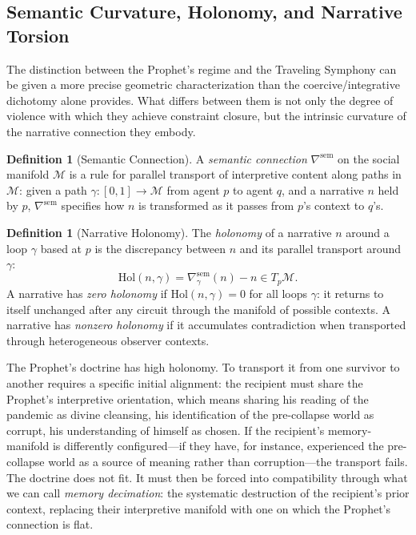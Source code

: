 \documentclass[12pt, oneside]{article}
\theoremstyle{plain}
\theoremstyle{definition}
\newtheorem{definition}[theorem]{Definition}
\theoremstyle{remark}
\begin{document}
\subsection{Semantic Curvature, Holonomy, and Narrative Torsion}

The distinction between the Prophet's regime and the Traveling
Symphony can be given a more precise geometric characterization than
the coercive/integrative dichotomy alone provides. What differs
between them is not only the degree of violence with which they
achieve constraint closure, but the intrinsic curvature of the
narrative connection they embody.

\begin{definition}[Semantic Connection]
A \emph{semantic connection} $\nabla^{\mathrm{sem}}$ on the social
manifold $\mathcal{M}$ is a rule for parallel transport of
interpretive content along paths in $\mathcal{M}$: given a path
$\gamma : [0,1] \to \mathcal{M}$ from agent $p$ to agent $q$, and
a narrative $n$ held by $p$, $\nabla^{\mathrm{sem}}$ specifies how
$n$ is transformed as it passes from $p$'s context to $q$'s.
\end{definition}

\begin{definition}[Narrative Holonomy]
The \emph{holonomy} of a narrative $n$ around a loop $\gamma$ based
at $p$ is the discrepancy between $n$ and its parallel transport
around $\gamma$:
\[
  \mathrm{Hol}(n, \gamma) = \nabla^{\mathrm{sem}}_\gamma(n) - n \in T_p\mathcal{M}.
\]
A narrative has \emph{zero holonomy} if $\mathrm{Hol}(n, \gamma) = 0$
for all loops $\gamma$: it returns to itself unchanged after any
circuit through the manifold of possible contexts. A narrative has
\emph{nonzero holonomy} if it accumulates contradiction when
transported through heterogeneous observer contexts.
\end{definition}

The Prophet's doctrine has high holonomy. To transport it from one
survivor to another requires a specific initial alignment: the
recipient must share the Prophet's interpretive orientation, which
means sharing his reading of the pandemic as divine cleansing, his
identification of the pre-collapse world as corrupt, his
understanding of himself as chosen. If the recipient's
memory-manifold is differently configured---if they have, for
instance, experienced the pre-collapse world as a source of meaning
rather than corruption---the transport fails. The doctrine does not
fit. It must then be forced into compatibility through what we can
call \emph{memory decimation}: the systematic destruction of the
recipient's prior context, replacing their interpretive manifold
with one on which the Prophet's connection is flat.
\end{document}
